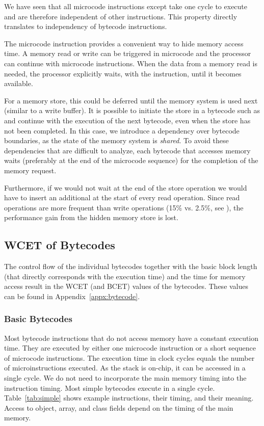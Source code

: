 We have seen that all microcode instructions except  take
one cycle to execute and are therefore independent of other
instructions. This property directly translates to independency of
bytecode instructions.

The  microcode instruction provides a convenient way to
hide memory access time. A memory read or write can be triggered in
microcode and the processor can continue with microcode
instructions. When the data from a memory read is needed, the
processor explicitly waits, with the  instruction, until
it becomes available.

For a memory store, this  could be deferred until the
memory system is used next (similar to a write buffer). It is
possible to initiate the store in a bytecode such as 
and continue with the execution of the next bytecode, even when the
store has not been completed. In this case, we introduce a
dependency over bytecode boundaries, as the state of the memory
system is \emph{shared}. To avoid these dependencies that are
difficult to analyze, each bytecode that accesses memory waits
(preferably at the end of the microcode sequence) for the completion
of the memory request.

Furthermore, if we would not wait at the end of the store operation
we would have to insert an additional  at the start of
every read operation. Since read operations are more frequent than
write operations (15\% vs. 2.5\%, see \cite{jop:thesis}), the
performance gain from the hidden memory store is lost.

\subsection{WCET of Bytecodes}

\label{sec:wcet:bc} The control flow of the individual bytecodes
together with the basic block length (that directly corresponds with
the execution time) and the time for memory access result in the WCET
(and BCET) values of the bytecodes. These values can be found in
Appendix~\ref{appx:bytecode}.

\subsubsection{Basic Bytecodes}

Most bytecode instructions that do not access memory have a constant
execution time. They are executed by either one microcode instruction
or a short sequence of microcode instructions. The execution time in
clock cycles equals the number of microinstructions executed. As the
stack is on-chip, it can be accessed in a single cycle. We do not
need to incorporate the main memory timing into the instruction
timing. Most simple bytecodes execute in a single cycle.
Table~\ref{tab:simple} shows example instructions, their timing, and
their meaning. Access to object, array, and class fields depend on
the timing of the main memory.

